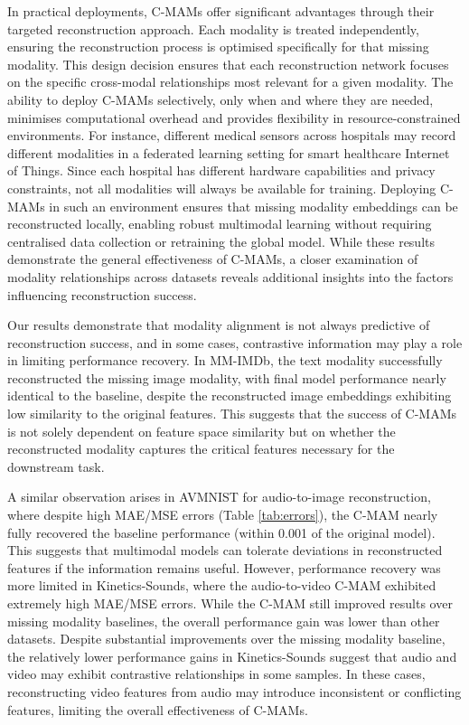 In practical deployments, C-MAMs offer significant advantages through their targeted reconstruction approach. Each modality is treated independently, ensuring the reconstruction process is optimised specifically for that missing modality. This design decision ensures that each reconstruction network focuses on the specific cross-modal relationships most relevant for a given modality. The ability to deploy C-MAMs selectively, only when and where they are needed, minimises computational overhead and provides flexibility in resource-constrained environments. For instance, different medical sensors across hospitals may record different modalities in a federated learning setting for smart healthcare Internet of Things. Since each hospital has different hardware capabilities and privacy constraints, not all modalities will always be available for training. Deploying C-MAMs in such an environment ensures that missing modality embeddings can be reconstructed locally, enabling robust multimodal learning without requiring centralised data collection or retraining the global model. While these results demonstrate the general effectiveness of C-MAMs, a closer examination of modality relationships across datasets reveals additional insights into the factors influencing reconstruction success.

Our results demonstrate that modality alignment is not always predictive of reconstruction success, and in some cases, contrastive information may play a role in limiting performance recovery. In MM-IMDb, the text modality successfully reconstructed the missing image modality, with final model performance nearly identical to the baseline, despite the reconstructed image embeddings exhibiting low similarity to the original features. This suggests that the success of C-MAMs is not solely dependent on feature space similarity but on whether the reconstructed modality captures the critical features necessary for the downstream task.

A similar observation arises in AVMNIST for audio-to-image reconstruction, where despite high MAE/MSE errors (Table \ref{tab:errors}), the C-MAM nearly fully recovered the baseline performance (within 0.001 of the original model). This suggests that multimodal models can tolerate deviations in reconstructed features if the information remains useful. However, performance recovery was more limited in Kinetics-Sounds, where the audio-to-video C-MAM exhibited extremely high MAE/MSE errors. While the C-MAM still improved results over missing modality baselines, the overall performance gain was lower than other datasets. Despite substantial improvements over the missing modality baseline, the relatively lower performance gains in Kinetics-Sounds suggest that audio and video may exhibit contrastive relationships in some samples. In these cases, reconstructing video features from audio may introduce inconsistent or conflicting features, limiting the overall effectiveness of C-MAMs.

